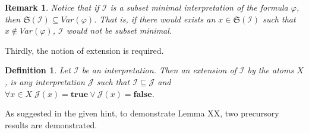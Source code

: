 \documentclass [11pt]{article}
\newcommand{\True}{\mathbf{true}}
\newcommand{\False}{\mathbf{false}}
\newcommand{\sto}{\Rightarrow}
\newcommand{\var}{\mathit{Var}}
\newtheorem{lemma}[theorem]{Lemma}
\newtheorem{definition}[theorem]{Definition}
\newtheorem{remark}[theorem]{Remark}
\begin{document}
\begin{remark}
Notice that if $\mathcal{I}$ is a subset minimal interpretation of the formula $\varphi$, then $\mathfrak{S}(\mathcal{I}) \subseteq \var(\varphi)$. That is, if there would exists an $x \in \mathfrak{S}(\mathcal{I})$ such that $x\notin \var(\varphi)$, $\mathcal{I}$ would not be subset minimal.
\end{remark}



Thirdly, the notion of extension is required.

\begin{definition}
Let $\mathcal{I}$ be an interpretation. Then an extension of $\mathcal{I}$ by the atoms $X$, is any interpretation $\mathcal{J}$ such that $\mathcal{I} \subseteq \mathcal{J}$ and $\forall x \in X \; \mathcal{J}(x)=\True \lor \mathcal{J}(x)=\False$.
\end{definition}
%


As suggested in the given hint, to demonstrate Lemma XX, two precursory results are demonstrated.
\end{document}
